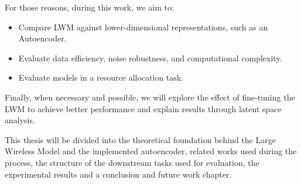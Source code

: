 For those reasons, during this work, we aim to:

\begin{itemize}
    \item Compare LWM against lower-dimensional representations, such as an Autoencoder.
    \item Evaluate data efficiency, noise robustness, and computational complexity.
    \item Evaluate models in a resource allocation task.
\end{itemize}

Finally, when necessary and possible, we will explore the effect of fine-tuning the LWM to achieve better performance and explain results through latent space analysis.

This thesis will be divided into the theoretical foundation behind the Large Wireless Model and the implemented autoencoder, related works used during the process, the structure of the downstream tasks used for evaluation, the experimental results and a conclusion and future work chapter.